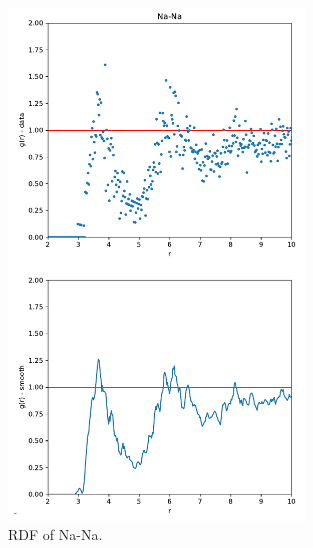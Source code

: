 \documentclass[10pt]{article}
\begin{document}
    \begin{figure}[H]
            \centering
            \includegraphics[width = 0.7\textwidth]{RDF-NaNa.png}
            \caption{RDF of Na-Na.}
            \label{fig:rdf_Na-Na}
    \end{figure}
\end{document}
